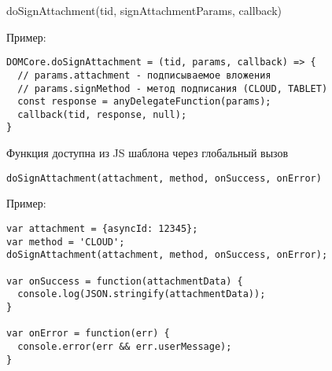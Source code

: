 doSignAttachment(tid,
signAttachmentParams, callback) 

Пример:

\begin{verbatim}
DOMCore.doSignAttachment = (tid, params, callback) => {
  // params.attachment - подписываемое вложения
  // params.signMethod - метод подписания (CLOUD, TABLET)
  const response = anyDelegateFunction(params);
  callback(tid, response, null);
}
\end{verbatim}

Функция доступна из JS шаблона через глобальный вызов

\begin{verbatim}
doSignAttachment(attachment, method, onSuccess, onError) 
\end{verbatim}

Пример:
\begin{verbatim}
var attachment = {asyncId: 12345};
var method = 'CLOUD';
doSignAttachment(attachment, method, onSuccess, onError);

var onSuccess = function(attachmentData) {
  console.log(JSON.stringify(attachmentData));
}

var onError = function(err) {
  console.error(err && err.userMessage);
}
\end{verbatim}

